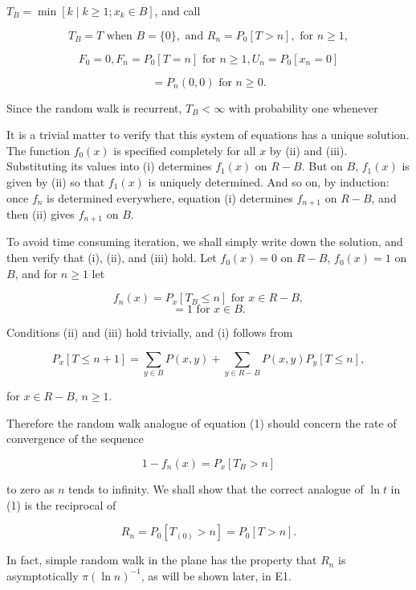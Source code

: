 $T_B = \min [k \mid k \geq 1; x_k \in B]$, and call

$$T_B = T \text{ when } B = \{0\}, \text{ and } R_n = P_0[T > n], \text{ for } n \geq 1,$$

$$F_0 = 0, F_n = P_0[T = n] \text{ for } n \geq 1, U_n = P_0[x_n = 0]$$

$$= P_n(0,0) \text{ for } n \geq 0.$$

Since the random walk is recurrent, $T_B < \infty$ with probability one whenever

It is a trivial matter to verify that this system of equations has a unique solution. The function $f_0(x)$ is specified completely for all $x$ by (ii) and (iii). Substituting its values into (i) determines $f_1(x)$ on $R - B$. But on $B$, $f_1(x)$ is given by (ii) so that $f_1(x)$ is uniquely determined. And so on, by induction: once $f_n$ is determined everywhere, equation (i) determines $f_{n+1}$ on $R - B$, and then (ii) gives $f_{n+1}$ on $B$.

To avoid time consuming iteration, we shall simply write down the solution, and then verify that (i), (ii), and (iii) hold. Let $f_0(x) = 0$ on $R - B$, $f_0(x) = 1$ on $B$, and for $n \geq 1$ let

$$f_n(x) = P_x[T_B \leq n] \text{ for } x \in R - B,$$
$$= 1 \text{ for } x \in B.$$

Conditions (ii) and (iii) hold trivially, and (i) follows from

$$P_x[T \leq n + 1] = \sum_{y \in B} P(x,y) + \sum_{y \in R-B} P(x,y)P_y[T \leq n],$$

for $x \in R - B$, $n \geq 1$.

Therefore the random walk analogue of equation (1) should concern the rate of convergence of the sequence

$$1 - f_n(x) = P_x[T_B > n]$$

to zero as $n$ tends to infinity. We shall show that the correct analogue of $\ln t$ in (1) is the reciprocal of

$$R_n = P_0[T_{(0)} > n] = P_0[T > n].$$

In fact, simple random walk in the plane has the property that $R_n$ is asymptotically $\pi(\ln n)^{-1}$, as will be shown later, in E1.